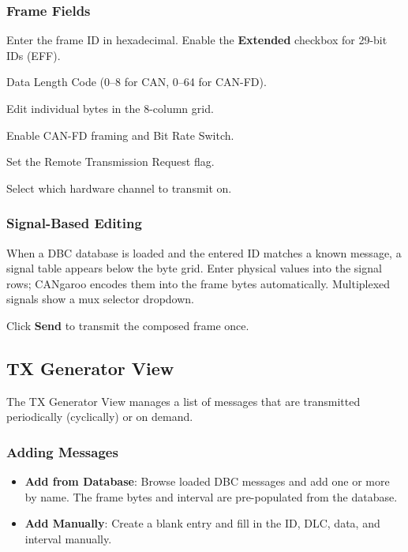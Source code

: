 \documentclass[a4paper,11pt]{article}
\newcommand{\ui}[1]{\textbf{#1}}
\begin{document}
\subsubsection{Frame Fields}

\begin{description}[leftmargin=2em, style=nextline]
  \item[Message ID] Enter the frame ID in hexadecimal. Enable the \ui{Extended}
        checkbox for 29-bit IDs (EFF).
  \item[DLC] Data Length Code (0–8 for CAN, 0–64 for CAN-FD).
  \item[Data bytes] Edit individual bytes in the 8-column grid.
  \item[FD / BRS] Enable CAN-FD framing and Bit Rate Switch.
  \item[RTR] Set the Remote Transmission Request flag.
  \item[Interface] Select which hardware channel to transmit on.
\end{description}

\subsubsection{Signal-Based Editing}

When a DBC database is loaded and the entered ID matches a known message, a signal
table appears below the byte grid. Enter physical values into the signal rows;
CANgaroo encodes them into the frame bytes automatically. Multiplexed signals show
a mux selector dropdown.

Click \ui{Send} to transmit the composed frame once.

\subsection{TX Generator View}
\label{sec:txgen}

The TX Generator View manages a list of messages that are transmitted periodically
(cyclically) or on demand.

\subsubsection{Adding Messages}

\begin{itemize}
  \item \ui{Add from Database}: Browse loaded DBC messages and add one or more by
        name. The frame bytes and interval are pre-populated from the database.
  \item \ui{Add Manually}: Create a blank entry and fill in the ID, DLC, data, and
        interval manually.
\end{itemize}
\end{document}
